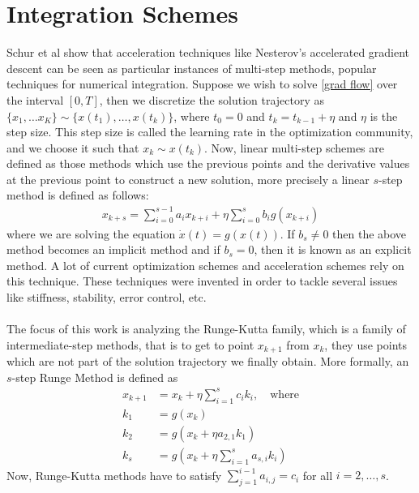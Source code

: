 
\section{Integration Schemes}
Schur et al \cite{integration} show that acceleration
techniques like Nesterov's accelerated gradient descent
can be seen as particular instances of multi-step methods,
popular techniques for numerical integration. Suppose we
wish to solve \eqref{grad flow} over the interval $[0, T]$,
then we discretize the solution trajectory as
$ \{ x_{1}, \dots x_{K} \} \sim \{ x(t_{1}), \dots, x(t_{k}) \} $,
where $t_0 = 0$ and $t_{k} = t_{k - 1} + \eta$ and $\eta$ is
the step size. This step size is called the learning rate in
the optimization community, and we choose it such that
$x_k \sim x(t_{k})$. Now, linear multi-step schemes are defined
as those methods which use the previous points and the derivative
values at the previous point to construct a new solution, more
precisely a linear $s$-step method is defined as follows:
\begin{align*}
  x_{k + s} = \sum_{i = 0}^{s - 1} a_{i} x_{k + i} +
  \eta \sum_{i = 0}^{s} b_{i} g(x_{k + i})
\end{align*}
where we are solving the equation $\dot{x}(t) = g(x(t))$.
If $b_{s} \neq 0$ then the above method becomes an implicit
method and if $b_{s} = 0$, then it is known as an explicit
method. A lot of current optimization schemes and acceleration
schemes rely on this technique. These techniques were invented
in order to tackle several issues like stiffness,
stability, error control, etc.
\\
\\
The focus of this work is analyzing the Runge-Kutta family,
which is a family of intermediate-step methods, that is to
get to point $x_{k + 1}$ from $x_{k}$, they use points
which are not part of the solution trajectory we finally
obtain. More formally, an $s$-step Runge Method is defined as
\begin{align*}
x_{k + 1} &= x_{k} + \eta \sum_{i = 1}^{s} c_{i} k_{i}, \quad \text{where} \\
k_{1} &= g(x_{k}) \\
k_{2} &= g(x_{k} + \eta a_{2, 1}k_{1}) \\
k_{s} &= g(x_{k} + \eta \sum_{i=1}^{s} a_{s, i} k_{i})
\end{align*}
Now, Runge-Kutta methods have to satisfy
$\sum_{j=1}^{i-1}a_{i, j} = c_{i}$ for all $i = 2, \dots, s$.
